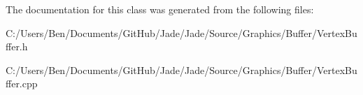 The documentation for this class was generated from the following files\+:\begin{DoxyCompactItemize}
\item 
C\+:/\+Users/\+Ben/\+Documents/\+Git\+Hub/\+Jade/\+Jade/\+Source/\+Graphics/\+Buffer/Vertex\+Buffer.\+h\item 
C\+:/\+Users/\+Ben/\+Documents/\+Git\+Hub/\+Jade/\+Jade/\+Source/\+Graphics/\+Buffer/Vertex\+Buffer.\+cpp\end{DoxyCompactItemize}
